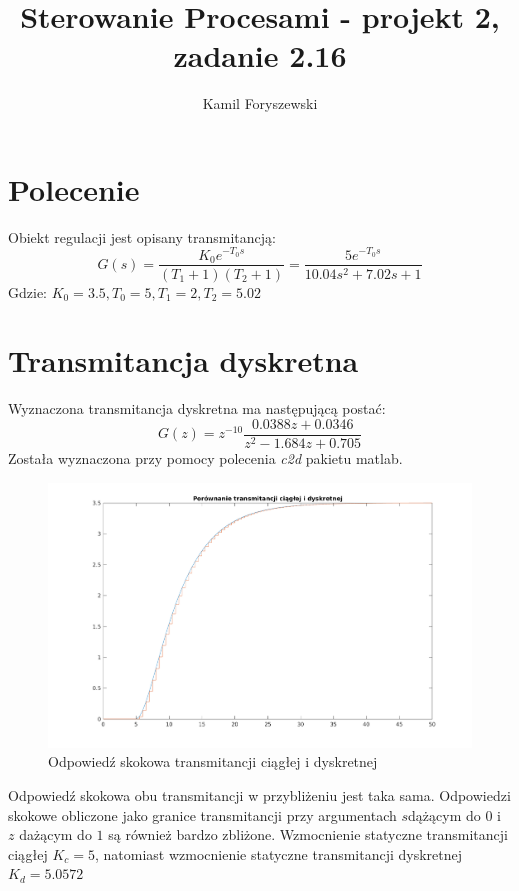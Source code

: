 \documentclass[a4paper, 11pt]{article}
\author{Kamil Foryszewski}
\title{Sterowanie Procesami - projekt 2, zadanie 2.16}
\begin{document}

\maketitle
\tableofcontents

\section{Polecenie}
Obiekt regulacji jest opisany transmitancją: 
$$G(s) = \frac{K_0e^{-T_0s}}{(T_1 + 1)(T_2+1)}  = \frac{5e^{-T_0s}}{10.04s^2+7.02s +1}  $$
Gdzie: 
$K_0 = 3.5, T_0 = 5, T_1 = 2, T_2 = 5.02$

\section{Transmitancja dyskretna}
Wyznaczona transmitancja dyskretna ma następującą postać: 
$$G(z) = z^{-10}\frac{0.0388z+0.0346}{z^2-1.684z+0.705}$$
Została wyznaczona przy pomocy polecenia \emph{c2d} pakietu matlab. 
\begin{figure}[htp]
\centering
\includegraphics[scale=0.6]{1_1.png}
\caption{Odpowiedź skokowa transmitancji ciągłej i dyskretnej}
\label{}
\end{figure}%
Odpowiedź skokowa obu transmitancji w przybliżeniu jest taka sama. Odpowiedzi skokowe obliczone jako granice transmitancji przy argumentach $s$dążącym do $0$ i $z$ dażącym do $1$ są również bardzo zbliżone. Wzmocnienie statyczne transmitancji ciągłej $K_c = 5$, natomiast wzmocnienie statyczne transmitancji dyskretnej $K_d = 5.0572$
\end{document}
